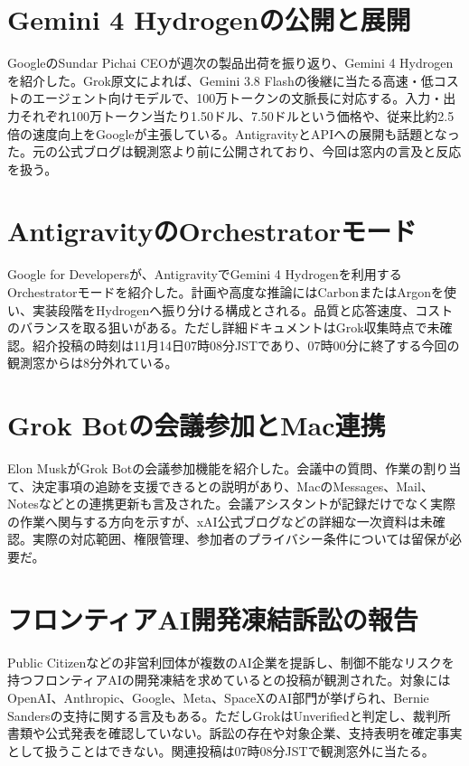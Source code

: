 \section{Gemini 4 Hydrogenの公開と展開}
GoogleのSundar Pichai CEOが週次の製品出荷を振り返り、Gemini 4 Hydrogenを紹介した。Grok原文によれば、Gemini 3.8 Flashの後継に当たる高速・低コストのエージェント向けモデルで、100万トークンの文脈長に対応する。入力・出力それぞれ100万トークン当たり1.50ドル、7.50ドルという価格や、従来比約2.5倍の速度向上をGoogleが主張している。AntigravityとAPIへの展開も話題となった。元の公式ブログは観測窓より前に公開されており、今回は窓内の言及と反応を扱う。

\section{AntigravityのOrchestratorモード}
Google for Developersが、AntigravityでGemini 4 Hydrogenを利用するOrchestratorモードを紹介した。計画や高度な推論にはCarbonまたはArgonを使い、実装段階をHydrogenへ振り分ける構成とされる。品質と応答速度、コストのバランスを取る狙いがある。ただし詳細ドキュメントはGrok収集時点で未確認。紹介投稿の時刻は11月14日07時08分JSTであり、07時00分に終了する今回の観測窓からは8分外れている。

\section{Grok Botの会議参加とMac連携}
Elon MuskがGrok Botの会議参加機能を紹介した。会議中の質問、作業の割り当て、決定事項の追跡を支援できるとの説明があり、MacのMessages、Mail、Notesなどとの連携更新も言及された。会議アシスタントが記録だけでなく実際の作業へ関与する方向を示すが、xAI公式ブログなどの詳細な一次資料は未確認。実際の対応範囲、権限管理、参加者のプライバシー条件については留保が必要だ。

\section{フロンティアAI開発凍結訴訟の報告}
Public Citizenなどの非営利団体が複数のAI企業を提訴し、制御不能なリスクを持つフロンティアAIの開発凍結を求めているとの投稿が観測された。対象にはOpenAI、Anthropic、Google、Meta、SpaceXのAI部門が挙げられ、Bernie Sandersの支持に関する言及もある。ただしGrokはUnverifiedと判定し、裁判所書類や公式発表を確認していない。訴訟の存在や対象企業、支持表明を確定事実として扱うことはできない。関連投稿は07時08分JSTで観測窓外に当たる。

